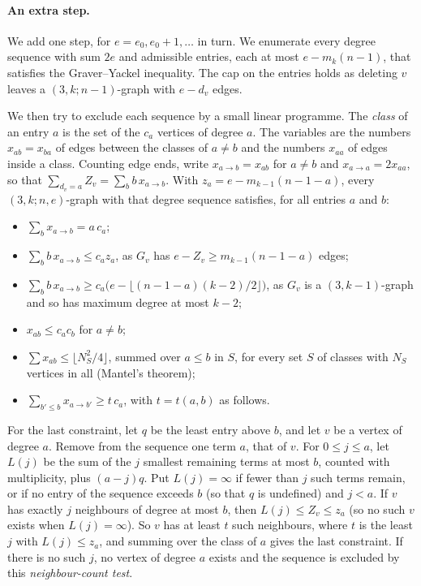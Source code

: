 \documentclass[11pt]{article}
\theoremstyle{spacedplain}
\theoremstyle{spaceddef}
\theoremstyle{spacedremark}
\begin{document}
\paragraph{An extra step.}
We add one step, for $e=e_0,e_0+1,\dots$ in turn.
We enumerate every degree sequence with sum $2e$ and admissible entries, each at most $e-m_k(n-1)$, that satisfies the Graver--Yackel inequality.
The cap on the entries holds as deleting $v$ leaves a $(3,k;n-1)$-graph with $e-d_v$ edges.

We then try to exclude each sequence by a small linear programme.
The \emph{class} of an entry $a$ is the set of the $c_a$ vertices of degree $a$.
The variables are the numbers $x_{ab}=x_{ba}$ of edges between the classes of $a\ne b$ and the numbers $x_{aa}$ of edges inside a class.
Counting edge ends, write $x_{a\to b}=x_{ab}$ for $a\ne b$ and $x_{a\to a}=2x_{aa}$, so that $\sum_{d_v=a}Z_v=\sum_bb\,x_{a\to b}$.
With $z_a=e-m_{k-1}(n-1-a)$, every $(3,k;n,e)$-graph with that degree sequence satisfies, for all entries $a$ and $b$:
\begin{itemize}
\item $\sum_bx_{a\to b}=a\,c_a$;
\item $\sum_bb\,x_{a\to b}\le c_az_a$, as $G_v$ has $e-Z_v\ge m_{k-1}(n-1-a)$ edges;
\item $\sum_bb\,x_{a\to b}\ge c_a\big(e-\lfloor(n-1-a)(k-2)/2\rfloor\big)$, as $G_v$ is a $(3,k-1)$-graph and so has maximum degree at most $k-2$;
\item $x_{ab}\le c_ac_b$ for $a\ne b$;
\item $\sum x_{ab}\le\lfloor N_S^2/4\rfloor$, summed over $a\le b$ in $S$, for every set $S$ of classes with $N_S$ vertices in all (Mantel's theorem);
\item $\sum_{b'\le b}x_{a\to b'}\ge t\,c_a$, with $t=t(a,b)$ as follows.
\end{itemize}

For the last constraint, let $q$ be the least entry above $b$, and let $v$ be a vertex of degree $a$.
Remove from the sequence one term $a$, that of $v$.
For $0\le j\le a$, let $L(j)$ be the sum of the $j$ smallest remaining terms at most $b$, counted with multiplicity, plus $(a-j)q$.
Put $L(j)=\infty$ if fewer than $j$ such terms remain, or if no entry of the sequence exceeds $b$ (so that $q$ is undefined) and $j<a$.
If $v$ has exactly $j$ neighbours of degree at most $b$, then $L(j)\le Z_v\le z_a$ (so no such $v$ exists when $L(j)=\infty$).
So $v$ has at least $t$ such neighbours, where $t$ is the least $j$ with $L(j)\le z_a$, and summing over the class of $a$ gives the last constraint.
If there is no such $j$, no vertex of degree $a$ exists and the sequence is excluded by this \emph{neighbour-count test}.
\end{document}
